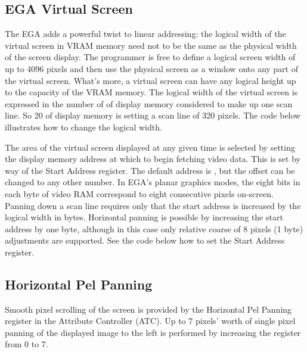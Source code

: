 \documentclass[book.tex]{subfiles}
\begin{document}
\subsection{EGA Virtual Screen}

The EGA adds a powerful twist to linear addressing: the logical width of the virtual screen in VRAM memory need not to be the same as the physical width of the screen display. The programmer is free to define a logical screen width of up to 4096 pixels and then use the physical screen as a window onto any part of the virtual screen. What's more, a virtual screen can have any logical height up to the capacity of the VRAM memory. The logical width of the virtual screen is expressed in the number of  of display memory considered to make up one scan line. So 20  of display memory is setting a scan line of 320 pixels. The code below illustrates how to change the logical width.\\

\begin{minipage}{\textwidth}
  
  \end{minipage}
  \label{ega_pel_pan}
  \par

The area of the virtual screen displayed at any given time is selected by setting the display memory address at which to begin fetching video data. This is set by way of the Start Address register. The default address is , but the offset can be changed to any other number. In EGA's planar graphics modes, the eight bits in each byte of video RAM correspond to eight consecutive pixels on-screen. Panning down a scan line requires only that the start address is increased by the logical width in bytes. Horizontal panning is possible by increasing the start address by one byte, although in this case only relative coarse of 8 pixels (1 byte)  adjustments are supported. See the code below how to set the Start Address register.

\begin{minipage}{\textwidth}
  
  \end{minipage}
  \label{ega_set_address}
  \par

\subsection{Horizontal Pel Panning}
Smooth pixel scrolling of the screen is provided by the Horizontal Pel Panning register in the Attribute Controller (ATC). Up to 7 pixels' worth of single pixel panning of the displayed image to the left is performed by increasing the register from 0 to 7. \\
\par
\end{document}
